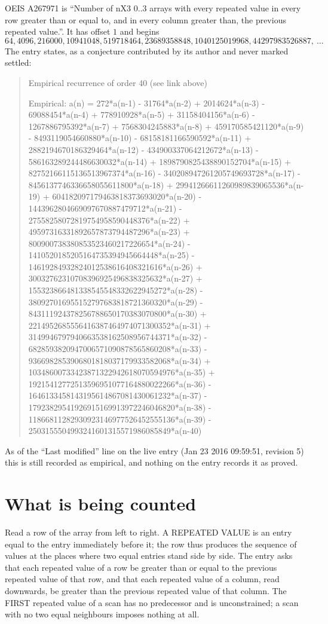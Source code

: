 \documentclass[11pt,a4paper]{article}
\theoremstyle{plain}
\theoremstyle{definition}
\begin{document}
OEIS A267971 is ``Number of nX3 0..3 arrays with every repeated value in every row greater than or equal to, and in every column greater than, the previous repeated value.''. It has offset $1$ and begins
\[
64, 4096, 216000, 10941048, 519718464, 23689358848, 1040125019968, 44297983526887,\ \dots
\]
The entry states, as a conjecture contributed by its author and never marked settled:
\begin{quote}
Empirical recurrence of order 40 (see link above)

Empirical: a(n) = 272*a(n-1) - 31764*a(n-2) + 2014624*a(n-3) - 69088454*a(n-4) + 778910928*a(n-5) + 31158404156*a(n-6) - 1267886795392*a(n-7) + 7568304245883*a(n-8) + 459170585421120*a(n-9) - 8493119054660880*a(n-10) - 68158181166590592*a(n-11) + 2882194670186329464*a(n-12) - 434900337064212672*a(n-13) - 586163289244486630032*a(n-14) + 1898790825438890152704*a(n-15) + 82752166115136513967374*a(n-16) - 340208947261205749693728*a(n-17) - 8456137746336658055611800*a(n-18) + 29941266611260989839065536*a(n-19) + 604182097179463818373693020*a(n-20) - 1443962804669097670887479712*a(n-21) - 27558258072819754958590448376*a(n-22) + 49597316331892657873794487296*a(n-23) + 800900738380853523460217226654*a(n-24) - 1410520185205164735394945664448*a(n-25) - 14619284932824012538616408321616*a(n-26) + 30032762310708396925496838325632*a(n-27) + 155323866481338545548332622945272*a(n-28) - 380927016955152797683818721360320*a(n-29) - 843111924378256788650170383070800*a(n-30) + 2214952685556416387464974071300352*a(n-31) + 3149946797940663538162508956744371*a(n-32) - 6828593820947006571090878565860208*a(n-33) - 9366982853906801818037179933582068*a(n-34) + 10348600733423871322942618070594976*a(n-35) + 19215412772513596951077164880022266*a(n-36) - 1646133458143195614867081430061232*a(n-37) - 17923829541926915169913972246046820*a(n-38) - 11866811282930923146977526452555136*a(n-39) - 2503155504993241601315571986085849*a(n-40)
\end{quote}
As of the ``Last modified'' line on the live entry (Jan 23 2016 09:59:51, revision 5) this is still
recorded as empirical, and nothing on the entry records it as proved.

\section{What is being counted}

Read a row of the array from left to right. A REPEATED VALUE is an entry equal to the entry
immediately before it; the row thus produces the sequence of values at the places where two
equal entries stand side by side. The entry asks that each repeated value of a row be
greater than or equal to the previous repeated value of that row, and that each repeated value of a column,
read downwards, be greater than the previous repeated value of that column. The FIRST repeated
value of a scan has no predecessor and is unconstrained; a scan with no two equal neighbours
imposes nothing at all.
\end{document}
